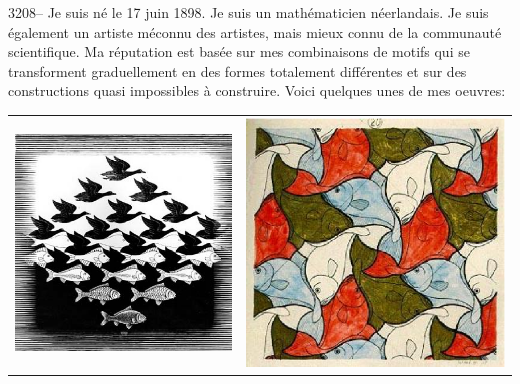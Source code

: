 \documentclass[letterpaper, 12pt]{article}
\begin{document}
3208-- Je suis n\'e le 17 juin 1898. Je suis un math\'ematicien n\'eerlandais. Je suis \'egalement un artiste m\'econnu des artistes, mais mieux connu de la communaut\'e scientifique. Ma r\'eputation est bas\'ee sur mes combinaisons de motifs qui se transforment graduellement en des formes totalement diff\'erentes et sur des constructions quasi impossibles \`a construire. Voici quelques unes de mes oeuvres:
\begin{center}
\begin{tabular}{c c}
\includegraphics[scale=0.45]{fishnbird.eps} & \includegraphics[scale=0.4]{symetry2.eps}\\

\end{tabular}
\end{center}
\end{document}
